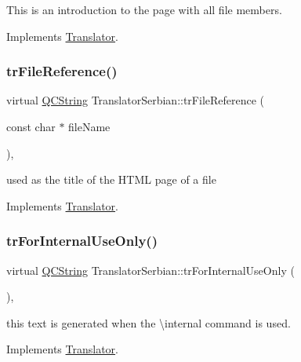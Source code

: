 This is an introduction to the page with all file members. 

Implements \mbox{\hyperlink{class_translator}{Translator}}.

\mbox{\label{class_translator_serbian_a580a2fcf1f070d13d7d3f1c12562cac0}} 
\subsubsection{\texorpdfstring{trFileReference()}{trFileReference()}}
{\footnotesize\ttfamily virtual \mbox{\hyperlink{class_q_c_string}{Q\+C\+String}} Translator\+Serbian\+::tr\+File\+Reference (\begin{DoxyParamCaption}\item[{const char $\ast$}]{file\+Name }\end{DoxyParamCaption})\hspace{0.3cm}{\ttfamily [inline]}, {\ttfamily [virtual]}}

used as the title of the H\+T\+ML page of a file 

Implements \mbox{\hyperlink{class_translator}{Translator}}.

\mbox{\label{class_translator_serbian_ab4d2ee55ef897328ca28e3072297abb1}} 
\subsubsection{\texorpdfstring{trForInternalUseOnly()}{trForInternalUseOnly()}}
{\footnotesize\ttfamily virtual \mbox{\hyperlink{class_q_c_string}{Q\+C\+String}} Translator\+Serbian\+::tr\+For\+Internal\+Use\+Only (\begin{DoxyParamCaption}{ }\end{DoxyParamCaption})\hspace{0.3cm}{\ttfamily [inline]}, {\ttfamily [virtual]}}

this text is generated when the \textbackslash{}internal command is used. 

Implements \mbox{\hyperlink{class_translator}{Translator}}.

\mbox{\label{class_translator_serbian_aa8a583fac0a8d358b2edfda016d184b3}} 
